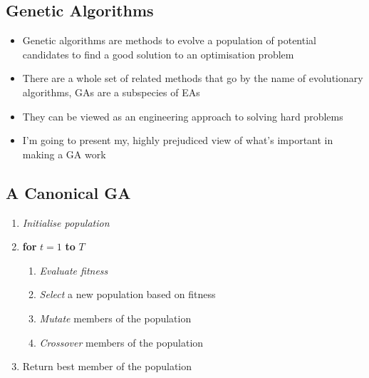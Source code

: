 \Outline %

\begin{slide}
\section{Genetic Algorithms}

\begin{PauseHighLight}
  \begin{itemize}
  \item Genetic algorithms are methods to evolve a population of
    potential candidates to find a good solution to an optimisation
    problem\pause
  \item There are a whole set of related methods that go by the name of
    evolutionary algorithms, GAs are a subspecies of EAs\pause
  \item They can be viewed as an engineering approach to solving hard
    problems\pause
  \item I'm going to present my, highly prejudiced view of what's
    important in making a GA work\pause
  \end{itemize}
\end{PauseHighLight}

\end{slide}


\begin{slide}
\section{A Canonical GA}

\begin{PauseHighLight}
\begin{enumerate}
\item \textit{Initialise population}\pause
\item \textbf{for} $t=1$ \textbf{to} $T$\pause
  \begin{enumerate}
  \item \textit{Evaluate fitness}\pause
  \item \textit{Select} a new population based on fitness\pause
  \item \textit{Mutate} members of the population\pause
  \item \textit{Crossover} members of the population\pause
  \end{enumerate}
\item Return best member of the population\pause
\end{enumerate}
\end{PauseHighLight}

\end{slide}

